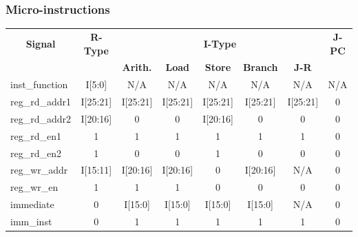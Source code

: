 \documentclass{article}
\begin{document}
  \newpage
  \begin{landscape}
  \subsubsection{Micro-instructions}
      
  \begin{table}[htp]
    \begin{center}
      \begin{tabular}{|l|c|c|c|c|c|c|c|}
        \hline
        \multicolumn{ 1}{|c|}{\cellcolor[gray]{0.9}\textbf{Signal}} & 
        \multicolumn{ 1}{c|}{\cellcolor[gray]{0.9}\textbf{R-Type}} & 
        \multicolumn{ 5}{c|}{\cellcolor[gray]{0.9}\textbf{I-Type}} & 
        \multicolumn{ 1}{c|}{\cellcolor[gray]{0.9}\textbf{J-PC}} \\ \cline{ 3-7}
        \multicolumn{ 1}{|c|}{\cellcolor[gray]{0.9}} & 
        \multicolumn{ 1}{l|}{\cellcolor[gray]{0.9}} & 
        \cellcolor[gray]{0.9}\textbf{Arith.} & 
        \cellcolor[gray]{0.9}\textbf{Load} & 
        \cellcolor[gray]{0.9}\textbf{Store} & 
        \cellcolor[gray]{0.9}\textbf{Branch} & 
        \cellcolor[gray]{0.9}\textbf{J-R} & 
        \multicolumn{ 1}{c|}{\cellcolor[gray]{0.9}} \\ \hline
        inst\_function        & I[5:0]    & N/A       & N/A       & N/A       & N/A       & N/A       & N/A \\ \hline
        reg\_rd\_addr1        & I[25:21]  & I[25:21]  & I[25:21]  & I[25:21]  & I[25:21]  & I[25:21]  & 0 \\ \hline
        reg\_rd\_addr2        & I[20:16]  & 0         & 0         & I[20:16]  & 0         & 0         & 0 \\ \hline
        reg\_rd\_en1          & 1         & 1         & 1         & 1         & 1         & 1         & 0 \\ \hline
        reg\_rd\_en2          & 1         & 0         & 0         & 1         & 0         & 0         & 0 \\ \hline
        reg\_wr\_addr         & I[15:11]  & I[20:16]  & I[20:16]  & 0         & I[20:16]  & N/A       & 0 \\ \hline
        reg\_wr\_en           & 1         & 1         & 1         & 0         & 0         & 0         & 0 \\ \hline
        immediate             & 0         & I[15:0]   & I[15:0]   & I[15:0]   & I[15:0]   & N/A       & 0 \\ \hline
        imm\_inst             & 0         & 1         & 1         & 1         & 1         & 1         & 0 \\ \hline

\end{tabular}
\end{center}
\end{table}
\end{landscape}
\end{document}
